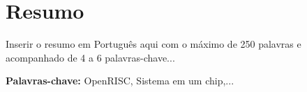 
\section*{Resumo}


Inserir o resumo em Portugu\^{e}s aqui com o máximo de 250 palavras e acompanhado de 4 a 6 palavras-chave...

\vfill

\textbf{\Large Palavras-chave:} OpenRISC, Sistema em um chip,...

\cleardoublepage

